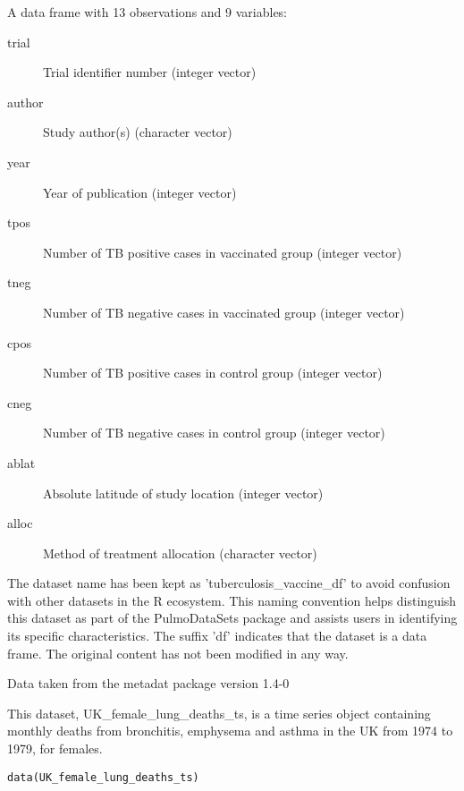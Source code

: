 \documentclass[a4paper]{book}
\begin{document}
%
\begin{Format}
A data frame with 13 observations and 9 variables:
\begin{description}

\item[trial] Trial identifier number (integer vector)
\item[author] Study author(s) (character vector)
\item[year] Year of publication (integer vector)
\item[tpos] Number of TB positive cases in vaccinated group (integer vector)
\item[tneg] Number of TB negative cases in vaccinated group (integer vector)
\item[cpos] Number of TB positive cases in control group (integer vector)
\item[cneg] Number of TB negative cases in control group (integer vector)
\item[ablat] Absolute latitude of study location (integer vector)
\item[alloc] Method of treatment allocation (character vector)

\end{description}

\end{Format}
%
\begin{Details}
The dataset name has been kept as 'tuberculosis\_vaccine\_df' to avoid confusion with other datasets
in the R ecosystem. This naming convention helps distinguish this dataset as part of the
PulmoDataSets package and assists users in identifying its specific characteristics.
The suffix 'df' indicates that the dataset is a data frame. The original content has not been modified
in any way.
\end{Details}
%
\begin{Source}
Data taken from the metadat package version 1.4-0
\end{Source}
%
\begin{Description}
This dataset, UK\_female\_lung\_deaths\_ts, is a time series object containing monthly deaths
from bronchitis, emphysema and asthma in the UK from 1974 to 1979, for females.
\end{Description}
%
\begin{Usage}
\begin{verbatim}
data(UK_female_lung_deaths_ts)
\end{verbatim}
\end{Usage}
\end{document}
